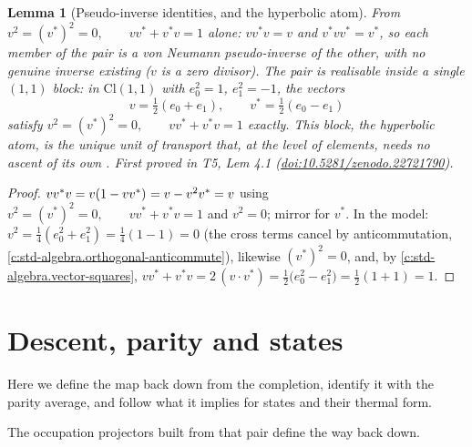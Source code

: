 \documentclass[11pt]{article}
\newtheorem{lemma}[theorem]{Lemma}
\theoremstyle{definition}
\theoremstyle{plain}
\providecommand{\Cl}{}\renewcommand{\Cl}{\mathrm{Cl}}
\begin{document}
\begin{lemma}[Pseudo-inverse identities, and the hyperbolic atom]\label{c:singularity.pseudo-inverse-identities-hyperbolic-atom}
From $v^2 = (v^*)^2 = 0, \qquad v v^* + v^* v = 1$ alone: $v v^* v = v$ and $v^* v v^* = v^*$, so each member of the pair is a von Neumann pseudo-inverse of the other, with no genuine inverse existing ($v$ is a zero divisor). The pair is realisable inside a single $(1,1)$ block: in $\Cl(1,1)$ with $e_0^2 = 1$, $e_1^2 = -1$, the vectors
\[
v = \tfrac12(e_0 + e_1), \qquad v^* = \tfrac12(e_0 - e_1)
\]
satisfy $v^2 = (v^*)^2 = 0, \qquad v v^* + v^* v = 1$ exactly. This block, the \emph{hyperbolic atom}, is the unique unit of transport that, at the level of elements, needs no ascent of its own \cite[Rem.~4.5]{ButlerT1}.
\emph{First proved in} T5, Lem 4.1 (\href{https://doi.org/10.5281/zenodo.22721790}{doi:10.5281/zenodo.22721790}).
\end{lemma}
\begin{proof}
$v v^* v = v(1 - v v^*)^{\vphantom{*}} = v - v^2 v^* = v$ using $v^2 = (v^*)^2 = 0, \qquad v v^* + v^* v = 1$ and $v^2 = 0$; mirror for $v^*$. In the model: $v^2 = \tfrac14(e_0^2 + e_1^2) = \tfrac14(1 - 1) = 0$ (the cross terms cancel by anticommutation, \ref{c:std-algebra.orthogonal-anticommute}), likewise $(v^*)^2 = 0$, and, by \ref{c:std-algebra.vector-squares}, $v v^* + v^* v = 2\,(v \cdot v^*) = \tfrac12\bigl(e_0^2 - e_1^2\bigr) = \tfrac12(1 + 1) = 1$.

\end{proof}

\section{Descent, parity and states}

Here we define the map back down from the completion, identify it with the parity average, and follow what it implies for states and their thermal form.

The occupation projectors built from that pair define the way back down.
\end{document}
